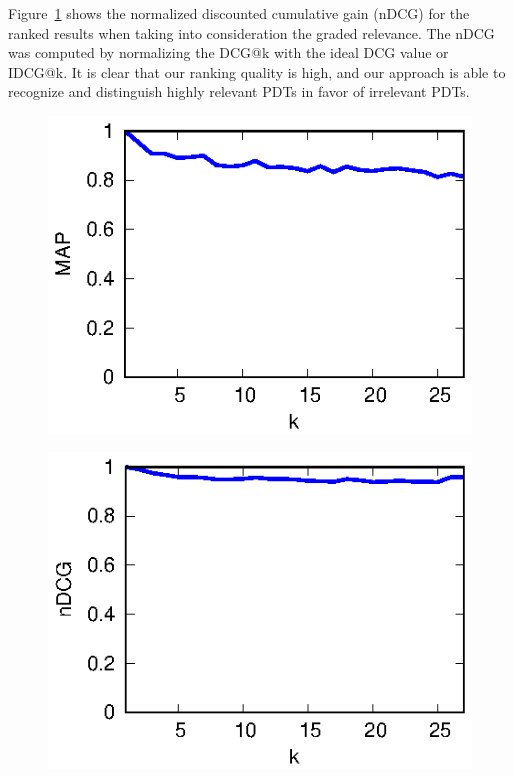 \documentclass[11pt]{article}
\begin{document}
Figure~\ref{fig-nDCG} shows the normalized discounted cumulative gain (nDCG) for the ranked results when taking into consideration the graded relevance. The nDCG was computed by normalizing the DCG@k with the ideal DCG value or IDCG@k. It is clear that our ranking quality is high, and our approach is able to recognize and distinguish highly relevant PDTs in favor of irrelevant PDTs.
\begin{figure}[!htb]
\centering
\begin{minipage}{.48\textwidth}
  \centering
  \includegraphics{submissions/Marian2023/plots/MAP.eps}
  \label{fig-MAP}
\end{minipage}\hfill
\begin{minipage}{.48\textwidth}
  \centering
  \includegraphics{submissions/Marian2023/plots/nDCG.eps}
  \label{fig-nDCG}
\end{minipage}\hfill
\end{figure}
\end{document}
